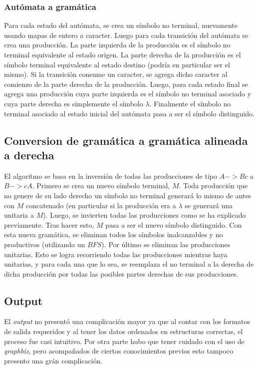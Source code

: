 \documentclass[a4paper,10pt]{article}
\begin{document}
\subsubsection{ Autómata a gramática }
           Para cada estado del autómata, se crea un símbolo no terminal, nuevamente usando mapas de entero a caracter. Luego para cada transición del 
autómata se crea una producción. La parte izquierda de la producción es el símbolo no terminal equivalente al estado origen. La parte derecha de 
la producción es el símbolo terminal equivalente al estado destino (podría en particular ser el mismo). Si la transición consume un caracter, 
se agrega dicho caracter al comienzo de la parte derecha de la producción. Luego, para cada estado final se agrega una producción cuya parte izquierda 
es el símbolo no terminal asociado y cuya parte derecha es simplemente el símbolo $\lambda$. Finalmente el símbolo no terminal asociado al estado inicial 
del autómata pasa a ser el símbolo distinguido.
 
      \subsection{Conversion de gramática a gramática alineada a derecha}
            El algoritmo se basa  en la inversión de todas las producciones de tipo $A->Bc$  a  $B->cA$. Primero se crea un nuevo símbolo terminal, $M$.
Toda producción que no genere de su lado derecho un símbolo no terminal generará lo mismo de antes con $M$ concatenado (en particular si la producción era 
a $\lambda$ se generará una unitaria a $M$). Luego, se invierten todas las producciones como se ha explicado previamente. Tras hacer esto, $M$ pasa a ser el 
nuevo símbolo distinguido. Con esta nueva gramática, se eliminan todos los símbolos inalcanzables y no productivos (utilizando un $BFS$). Por último se 
eliminan las producciones unitarias. Esto se logra recorriendo todas las producciones mientras haya unitarias, y para cada una que lo sea, se reemplaza 
el no terminal a la derecha de dicha producción por todas las posibles partes derechas de sus producciones. 
      \subsection{Output}
            El \textit{output} no presentó una complicación mayor ya que al contar con los formatos de salida 
            requeridos y al tener los datos ordenados en estructuras correctas, el proceso fue casi intuitivo.
            Por otra parte hubo que tener cuidado con el uso de \textit{graphbiz}, pero acompañados de ciertos
            conocimientos previos esto tampoco presento una grán complicación.
\end{document}

